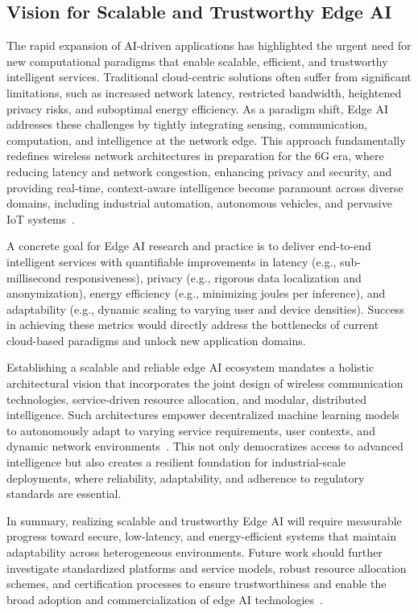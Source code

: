 \documentclass[sigconf]{acmart}
\begin{document}
\subsection{Vision for Scalable and Trustworthy Edge AI}

The rapid expansion of AI-driven applications has highlighted the urgent need for new computational paradigms that enable scalable, efficient, and trustworthy intelligent services. Traditional cloud-centric solutions often suffer from significant limitations, such as increased network latency, restricted bandwidth, heightened privacy risks, and suboptimal energy efficiency. As a paradigm shift, Edge AI addresses these challenges by tightly integrating sensing, communication, computation, and intelligence at the network edge. This approach fundamentally redefines wireless network architectures in preparation for the 6G era, where reducing latency and network congestion, enhancing privacy and security, and providing real-time, context-aware intelligence become paramount across diverse domains, including industrial automation, autonomous vehicles, and pervasive IoT systems~\cite{ref49}.

A concrete goal for Edge AI research and practice is to deliver end-to-end intelligent services with quantifiable improvements in latency (e.g., sub-millisecond responsiveness), privacy (e.g., rigorous data localization and anonymization), energy efficiency (e.g., minimizing joules per inference), and adaptability (e.g., dynamic scaling to varying user and device densities). Success in achieving these metrics would directly address the bottlenecks of current cloud-based paradigms and unlock new application domains.

Establishing a scalable and reliable edge AI ecosystem mandates a holistic architectural vision that incorporates the joint design of wireless communication technologies, service-driven resource allocation, and modular, distributed intelligence. Such architectures empower decentralized machine learning models to autonomously adapt to varying service requirements, user contexts, and dynamic network environments~\cite{ref49}. This not only democratizes access to advanced intelligence but also creates a resilient foundation for industrial-scale deployments, where reliability, adaptability, and adherence to regulatory standards are essential.

In summary, realizing scalable and trustworthy Edge AI will require measurable progress toward secure, low-latency, and energy-efficient systems that maintain adaptability across heterogeneous environments. Future work should further investigate standardized platforms and service models, robust resource allocation schemes, and certification processes to ensure trustworthiness and enable the broad adoption and commercialization of edge AI technologies~\cite{ref49}.
\end{document}

